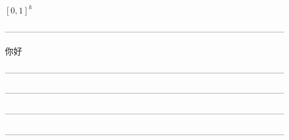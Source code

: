 \documentclass{article}
\begin{document}
$[0,1]^{k}$

--------------------------------------------------------------------------------------------------

你好

--------------------------------------------------------------------------------------------------

--------------------------------------------------------------------------------------------------

--------------------------------------------------------------------------------------------------

--------------------------------------------------------------------------------------------------
\end{document}
